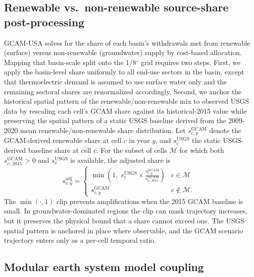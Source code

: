 \documentclass[fleqn,10pt]{wlscirep}
\begin{document}
\subsection*{Renewable vs.\ non-renewable source-share post-processing}

GCAM-USA solves for the share of each basin's withdrawals met from renewable (surface) versus non-renewable (groundwater) supply by cost-based allocation. Mapping that basin-scale split onto the 1/8$^{\circ}$ grid requires two steps. First, we apply the basin-level share uniformly to all end-use sectors in the basin, except that thermoelectric demand is assumed to use surface water only and the remaining sectoral shares are renormalized accordingly. Second, we anchor the historical spatial pattern of the renewable/non-renewable mix to observed USGS data by rescaling each cell's GCAM share against its historical-2015 value while preserving the spatial pattern of a static USGS baseline derived from the 2009-2020 mean renewable/non-renewable share distribution. Let $s^{\mathrm{GCAM}}_{c,y}$ denote the GCAM-derived renewable share at cell $c$ in year $y$, and $s^{\mathrm{USGS}}_c$ the static USGS-derived baseline share at cell $c$. For the subset of cells $\mathcal{M}$ for which both $s^{\mathrm{GCAM}}_{c,\,2015}>0$ and $s^{\mathrm{USGS}}_c$ is available, the adjusted share is
\begin{equation}
s^{\mathrm{adj}}_{c,y} =
\begin{cases}
\displaystyle \min\!\left(1,\; s^{\mathrm{USGS}}_c \times \frac{s^{\mathrm{GCAM}}_{c,y}}{s^{\mathrm{GCAM}}_{c,\,2015}}\right) & c \in \mathcal{M} \\[10pt]
s^{\mathrm{GCAM}}_{c,y}                                                                                        & c \notin \mathcal{M}.
\end{cases}
\label{eq:source-shares}
\end{equation}
The $\min(\cdot,1)$ clip prevents amplifications when the 2015 GCAM baseline is small. In groundwater-dominated regions the clip can mask trajectory increases, but it preserves the physical bound that a share cannot exceed one. The USGS spatial pattern is anchored in place where observable, and the GCAM scenario trajectory enters only as a per-cell temporal ratio.

\subsection*{Modular earth system model coupling}
\end{document}
